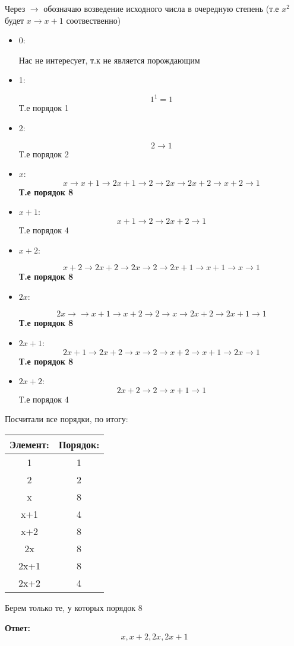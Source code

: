 \documentclass[a4paper,12pt]{article}
\begin{document}
Через $\rightarrow$ обозначаю возведение исходного числа в очередную степень (т.е $x^2$ будет $x \rightarrow x + 1$ соотвественно)

\begin{itemize}
\item 0:

Нас не интересует, т.к не является порождающим

\item 1:

\[
1^1 = 1
\]
Т.е порядок 1
\item 2:

\[
2 \rightarrow 1
\]
Т.е порядок 2 
\item $x$:
\[
x \rightarrow x + 1 \rightarrow 2x+1 \rightarrow 2 \rightarrow 2x \rightarrow 2x+ 2 \rightarrow x+2 \rightarrow 1
\]
\textbf{Т.е порядок 8}

\item $x+1$:
\[
x +1  \rightarrow 2 \rightarrow 2x+2 \rightarrow 1
\]
Т.е порядок 4

\item $x + 2$:

\[
x + 2 \rightarrow 2x +2 \rightarrow 2x \rightarrow 2 \rightarrow 2x+1 \rightarrow x+1 \rightarrow x \rightarrow 1
\]
\textbf{Т.е порядок 8}

\item $2x$:

\[
2x \rightarrow \rightarrow x+1 \rightarrow x + 2 \rightarrow 2 \rightarrow x \rightarrow 2x + 2 \rightarrow 2x + 1 \rightarrow 1
\]
\textbf{Т.е порядок 8}

\item $2x + 1$:
\[
2x + 1 \rightarrow 2x +2 \rightarrow x \rightarrow 2 \rightarrow x + 2 \rightarrow  x + 1 \rightarrow 2x \rightarrow 1
\]
\textbf{Т.е порядок 8}

\item $2x + 2$:
\[
2x +2 \rightarrow 2 \rightarrow x + 1 \rightarrow 1 
\]
Т.е порядок 4
\end{itemize}


Посчитали все порядки, по итогу:

\begin{center}
\begin{tabular}{|c|c|}
\hline
Элемент: & Порядок: \\
\hline
1 & 1 \\
\hline
2 & 2 \\
\hline
x & 8 \\
\hline
x+1 & 4 \\
\hline
x+2 & 8 \\
\hline
2x & 8 \\
\hline
2x+1 & 8 \\
\hline
2x+2 & 4 \\
\hline
\end{tabular}
\end{center}
Берем только те, у которых порядок 8
\begin{center}
\textbf{Ответ: } 
\[
x, x + 2 , 2x, 2x + 1
\]
\end{center}
\end{document}
